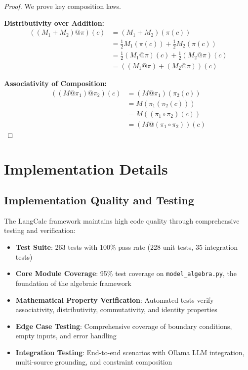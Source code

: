 \documentclass{article}
\theoremstyle{definition}
\begin{document}
\begin{proof}
We prove key composition laws.

\textbf{Distributivity over Addition:}
\begin{align}
((M_1 + M_2) @ \pi)(c) &= (M_1 + M_2)(\pi(c)) \\
&= \frac{1}{2}M_1(\pi(c)) + \frac{1}{2}M_2(\pi(c)) \\
&= \frac{1}{2}(M_1 @ \pi)(c) + \frac{1}{2}(M_2 @ \pi)(c) \\
&= ((M_1 @ \pi) + (M_2 @ \pi))(c)
\end{align}

\textbf{Associativity of Composition:}
\begin{align}
((M @ \pi_1) @ \pi_2)(c) &= (M @ \pi_1)(\pi_2(c)) \\
&= M(\pi_1(\pi_2(c))) \\
&= M((\pi_1 \circ \pi_2)(c)) \\
&= (M @ (\pi_1 \circ \pi_2))(c)
\end{align}
\end{proof}

\section{Implementation Details}

\subsection{Implementation Quality and Testing}

The LangCalc framework maintains high code quality through comprehensive testing and verification:

\begin{itemize}
    \item \textbf{Test Suite}: 263 tests with 100\% pass rate (228 unit tests, 35 integration tests)
    \item \textbf{Core Module Coverage}: 95\% test coverage on \texttt{model\_algebra.py}, the foundation of the algebraic framework
    \item \textbf{Mathematical Property Verification}: Automated tests verify associativity, distributivity, commutativity, and identity properties
    \item \textbf{Edge Case Testing}: Comprehensive coverage of boundary conditions, empty inputs, and error handling
    \item \textbf{Integration Testing}: End-to-end scenarios with Ollama LLM integration, multi-source grounding, and constraint composition
\end{itemize}
\end{document}
